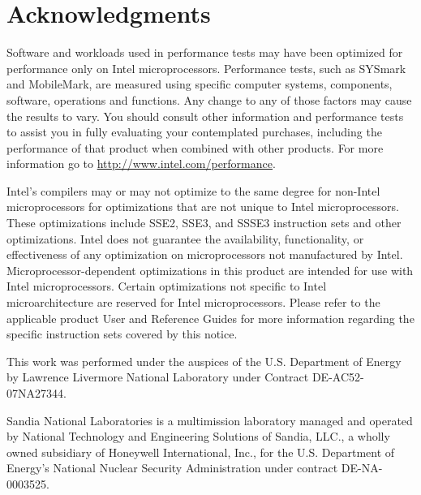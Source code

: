 \section*{Acknowledgments}


Software and workloads used in performance tests may have been
optimized for performance only on Intel microprocessors.  Performance
tests, such as SYSmark and MobileMark, are measured using specific
computer systems, components, software, operations and functions.  Any
change to any of those factors may cause the results to vary.  You
should consult other information and performance tests to assist you
in fully evaluating your contemplated purchases, including the
performance of that product when combined with other products.  For
more information go to \url{http://www.intel.com/performance}.

Intel's compilers may or may not optimize to the same degree for
non-Intel microprocessors for optimizations that are not unique to
Intel microprocessors. These optimizations include SSE2, SSE3, and
SSSE3 instruction sets and other optimizations. Intel does not
guarantee the availability, functionality, or effectiveness of any
optimization on microprocessors not manufactured by
Intel. Microprocessor-dependent optimizations in this product are
intended for use with Intel microprocessors. Certain optimizations not
specific to Intel microarchitecture are reserved for Intel
microprocessors. Please refer to the applicable product User and
Reference Guides for more information regarding the specific
instruction sets covered by this notice.

This work was performed under the auspices of the U.S. Department of Energy by
Lawrence Livermore National Laboratory under Contract DE-AC52-07NA27344.


Sandia National Laboratories is a multimission laboratory managed
and operated by National Technology and Engineering Solutions of
Sandia, LLC., a wholly owned subsidiary of Honeywell International,
Inc., for the U.S. Department of Energy's National Nuclear Security
Administration under contract DE-NA-0003525.

